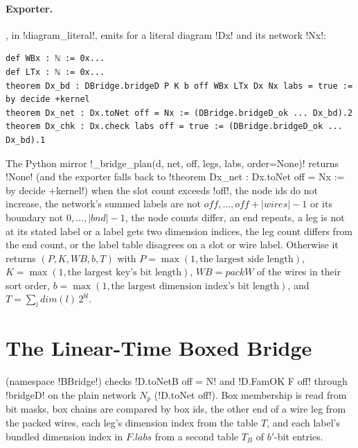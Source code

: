 {\paragraph{Exporter.} , in \py!diagram_literal!, emits for a literal diagram \lbx!Dx! and its network \lbx!Nx!:
\begin{lstlisting}[style=leanbox]
def WBx : ℕ := 0x...
def LTx : ℕ := 0x...
theorem Dx_bd : DBridge.bridgeD P K b off WBx LTx Dx Nx labs = true := by decide +kernel
theorem Dx_net : Dx.toNet off = Nx := (DBridge.bridgeD_ok ... Dx_bd).2
theorem Dx_chk : Dx.check labs off = true := (DBridge.bridgeD_ok ... Dx_bd).1
\end{lstlisting}
The Python mirror \py!_bridge_plan(d, net, off, legs, labs, order=None)! returns \py!None! (and the exporter falls back to \lbx!theorem Dx_net : Dx.toNet off = Nx := by decide +kernel!) when the slot count exceeds \py!off!, the node ids do not increase, the network's summed labels are not $\mathit{off},\dots,\mathit{off}+|\mathit{wires}|-1$ or its boundary not $0,\dots,|\mathit{bnd}|-1$, the node counts differ, an end repeats, a leg is not at its stated label or a label gets two dimension indices, the leg count differs from the end count, or the label table disagrees on a slot or wire label. Otherwise it returns $(P,K,\mathit{WB},b,T)$ with $P=\max(1,\text{the largest side length})$, $K=\max(1,\text{the largest key's bit length})$, $\mathit{WB}=\mathit{packW}$ of the wires in their sort order, $b=\max(1,\text{the largest dimension index's bit length})$, and $T=\sum_l \mathit{dim}(l)\,2^{bl}$.

\section{The Linear-Time Boxed Bridge}\label{sec:boxes-bbridge}

 (namespace \lbx!BBridge!) checks \lbx!D.toNetB off = N! and \lbx!D.FamOK F off! through \lbx!bridgeD! on the plain network $N_p$ (\lbx!D.toNet off!). Box membership is read from bit masks, box chains are compared by box ids, the other end of a wire leg from the packed wires, each leg's dimension index from the table $T$, and each label's bundled dimension index in $F.\mathit{labs}$ from a second table $T_B$ of $b'$-bit entries.

}
